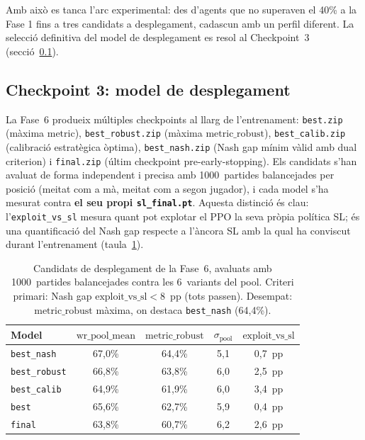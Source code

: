 Amb això es tanca l’arc experimental: des d’agents que no superaven el 40\% a la
Fase 1 fins a tres candidats a desplegament, cadascun amb un perfil diferent. 
La selecció definitiva del model de desplegament es resol al Checkpoint~3
(secció~\ref{sec:checkpoint3}).

\subsection{Checkpoint 3: model de desplegament}
\label{sec:checkpoint3}

La Fase~6 produeix múltiples checkpoints al llarg de l'entrenament: \texttt{best.zip}
(màxima \(\text{metric}\)), \texttt{best\_robust.zip} (màxima \(\text{metric\_robust}\)),
\texttt{best\_calib.zip} (calibració estratègica òptima), \texttt{best\_nash.zip} (Nash gap
mínim vàlid amb dual criterion) i \texttt{final.zip} (últim checkpoint pre-early-stopping).
Els candidats s'han avaluat de forma independent i precisa amb 1000~partides balancejades
per posició (meitat com a mà, meitat com a segon jugador), i cada model s'ha mesurat contra
\textbf{el seu propi \texttt{sl\_final.pt}}. Aquesta distinció és clau: l'\texttt{exploit\_vs\_sl}
mesura quant pot explotar el \ac{PPO} la seva pròpia política \ac{SL}; és una quantificació
del Nash gap respecte a l'àncora \ac{SL} amb la qual ha conviscut durant l'entrenament
(taula~\ref{tab:checkpoint3}).

\begin{table}[H]
  \centering
  \begin{tabular}{lcccc}
    \toprule
    Model & \(\text{wr\_pool\_mean}\) & \(\text{metric\_robust}\) & \(\sigma_{\text{pool}}\) & \(\text{exploit\_vs\_sl}\) \\
    \midrule
    \texttt{best\_nash}  & 67{,}0\% & 64{,}4\% & 5{,}1 & 0{,}7~pp \\
    \texttt{best\_robust} & 66{,}8\% & 63{,}8\% & 6{,}0 & 2{,}5~pp \\
    \texttt{best\_calib}  & 64{,}9\% & 61{,}9\% & 6{,}0 & 3{,}4~pp \\
    \texttt{best}        & 65{,}6\% & 62{,}7\% & 5{,}9 & 0{,}4~pp \\
    \texttt{final}       & 63{,}8\% & 60{,}7\% & 6{,}2 & 2{,}6~pp \\
    \bottomrule
  \end{tabular}
  \caption{Candidats de desplegament de la Fase~6, avaluats amb 1000~partides balancejades
           contra les 6~variants del pool. Criteri primari: Nash gap
           \(\text{exploit\_vs\_sl} < 8\)~pp (tots passen). Desempat: \(\text{metric\_robust}\)
           màxima, on destaca \texttt{best\_nash} (64{,}4\%).}%
  \label{tab:checkpoint3}
\end{table}

